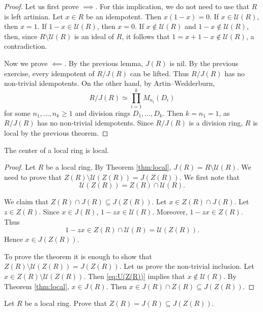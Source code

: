 \begin{proof}
    Let us first prove $\implies$. For this implication, we do not need to use that 
    $R$ is left artinian. Let $x\in R$ be an idempotent. Then $x(1-x)=0$. If $x\in\mathcal{U}(R)$, then 
    $x=1$. If $1-x\in\mathcal{U}(R)$, then $x=0$. If $x\not\in \mathcal{U}(R)$ and $1-x\not\in\mathcal{U}(R)$, 
    then, since $R\setminus\mathcal{U}(R)$ is an ideal of $R$, 
    it follows that 
    $1=x+1-x\not\in\mathcal{U}(R)$, a contradiction. 

    Now we prove $\impliedby$. By the previous lemma, $J(R)$ is nil. 
    By the previous exercise, every idempotent of $R/J(R)$ can be lifted. Thus $R/J(R)$ has 
    no non-trivial idempotents. On the other hand, by Artin--Wedderburn, 
    \[
    R/J(R)\simeq\prod_{i=1}^kM_{n_i}(D_i)
    \]
    for some $n_1,\dots,n_k\geq1$ and division rings $D_1,\dots,D_k$. Then 
    $k=n_1=1$, as $R/J(R)$ has no non-trivial idempotents. Since $R/J(R)$ is a division ring, 
    $R$ is local by the previous theorem. 
\end{proof}

\begin{theorem}
    The center of a local ring is local. 
\end{theorem}

\begin{proof}
    Let $R$ be a local ring. By Theorem \ref{thm:local}, $J(R)=R\setminus\mathcal{U}(R)$.  
    We need to prove that $Z(R)\setminus\mathcal{U}(Z(R))=J(Z(R))$. 
    We first note that
    \begin{equation}
    \label{eq:U(Z(R))}
        \mathcal{U}(Z(R))=Z(R)\cap\mathcal{U}(R).
    \end{equation}
    
    We claim that $Z(R)\cap J(R)\subseteq J(Z(R))$.  
    Let $x\in Z(R)\cap J(R)$. Let $z\in Z(R)$. Since $x\in J(R)$, $1-zx\in\mathcal{U}(R)$.
    Moreover, $1-zx\in Z(R)$. Thus 
    \[
    1-zx\in Z(R)\cap\mathcal{U}(R)=\mathcal{U}(Z(R)).
    \]
    Hence $x\in J(Z(R))$. 

    To prove the theorem it is enough to show that 
    $Z(R)\setminus\mathcal{U}(Z(R))=J(Z(R))$. Let us prove the non-trivial inclusion. 
    Let $x\in Z(R)\setminus\mathcal{U}(Z(R))$.  Then 
    \eqref{eq:U(Z(R))} implies that 
    $x\not\in\mathcal{U}(R)$. 
    By Theorem \ref{thm:local}, 
    $x\in J(R)$. Then $x\in J(R)\cap Z(R)\subseteq J(Z(R))$. 
\end{proof}

\begin{exercise}
\label{eq:local_center}
    Let $R$ be a local ring. Prove that 
    $Z(R)=J(R)\subseteq J(Z(R))$.  
\end{exercise}


